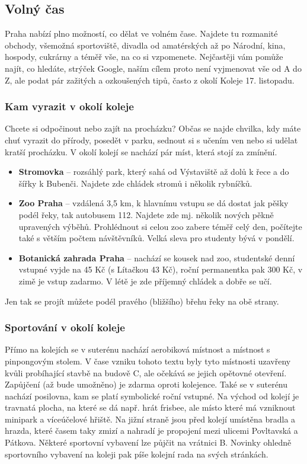 \subsection{Volný čas}
Praha nabízí plno možností, co dělat ve volném čase. Najdete tu rozmanité
obchody, všemožná sportoviště, divadla od amatérských až po Národní, kina,
hospody, cukrárny a téměř vše, na co si vzpomenete. Nejčastěji vám pomůže najít,
co hledáte, strýček Google, naším cílem proto není vyjmenovat vše od A do Z, ale
podat pár zažitých a ozkoušených tipů, často z okolí Koleje 17. listopadu.


\subsubsection{Kam vyrazit v okolí koleje}
Chcete si odpočinout nebo zajít na procházku? Občas se najde chvilka, kdy máte
chuť vyrazit do přírody, posedět v parku, sednout si s učením ven nebo si udělat
kratší procházku. V okolí kolejí se nachází pár míst, která stojí za zmínění.
\begin{itemize}
\item \textbf{Stromovka} – rozsáhlý park, který sahá od Výstaviště až dolů k
řece a do šířky k Bubenči. Najdete zde chládek stromů i několik rybníčků.
\item \textbf{Zoo Praha} – vzdálená 3,5 km, k hlavnímu vstupu se dá dostat jak
pěšky podél řeky, tak autobusem 112. Najdete zde mj. několik nových pěkně
upravených výběhů. Prohlédnout si celou zoo zabere téměř celý den, počítejte
také s větším počtem návštěvníků. Velká sleva pro studenty bývá v pondělí.
\item \textbf{Botanická zahrada Praha} – nachází se kousek nad zoo, studentské
denní vstupné vyjde na 45 Kč (s Lítačkou 43 Kč), roční permanentka pak 300 Kč, v
zimě je vstup zadarmo. V létě je zde příjemný chládek a dobře se učí.
\end{itemize}
Jen tak se projít můžete podél pravého (bližšího) břehu řeky na obě strany.


\subsubsection{Sportování v okolí koleje}
Přímo na kolejích se v suterénu nachází aerobiková místnost a místnost s
pinpongovým stolem. V čase vzniku tohoto textu byly tyto místnosti uzavřeny
kvůli probíhající stavbě na budově C, ale očekává se jejich opětovné otevření.
Zapůjčení (až bude umožněno) je zdarma oproti kolejence. Také se v suterénu
nachází posilovna, kam se platí symbolické roční vstupné. Na východ od kolejí je
travnatá plocha, na které se dá např. hrát frisbee, ale místo které má vzniknout
minipark a víceúčelové hřiště. Na jižní straně jsou před kolejí umístěna bradla
a hrazda, které časem taky zmizí a nahradí je propojení mezi ulicemi Povltavská
a Pátkova. Některé sportovní vybavení lze půjčit na vrátnici B. Novinky ohledně
sportovního vybavení na koleji pak píše kolejní rada na svých stránkách.

